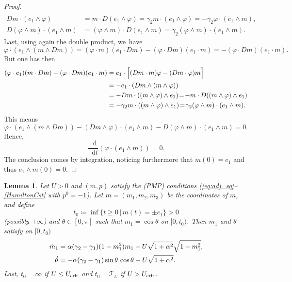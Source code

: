 \documentclass[JEP,XML,SOM,Unicode,NoEqCountersInSection,NoFloatCountersInSection,published]{cedram}
\newtheorem{lemma}[theorem]{Lemma}
\theoremstyle{definition}
\newcommand*\diff{\mathop{}\!\mathrm{d}}
\begin{document}
\begin{proof}
\begin{align*}
\\
Dm \cdot (e_1 \wedge \varphi) &= m \cdot D(e_1 \wedge \varphi) = \gamma_2 m \cdot (e_1 \wedge \varphi) = - \gamma_2 \varphi \cdot (e_1 \wedge m), \\
D (\varphi \wedge m) \cdot (e_1 \wedge m) &= (\varphi \wedge m) \cdot D (e_1 \wedge m) = \gamma_2 (\varphi \wedge m) \cdot (e_1 \wedge m).
\end{align*}
Last, using again the double product, we~have
\begin{equation*}
\varphi \cdot (e_1 \wedge (m \wedge Dm)) = (\varphi \cdot m) (e_1 \cdot Dm) - (\varphi \cdot Dm) (e_1 \cdot m) = - (\varphi \cdot Dm) (e_1 \cdot m).
\end{equation*}
But one has then
\begin{align*}
(\varphi \cdot e_1) (m \cdot Dm) - (\varphi \cdot Dm) (e_1 \cdot m) &= e_1 \cdot \Bigl[ (Dm \cdot m) \varphi - (Dm \cdot \varphi) m \Bigr] \\
& = -e_1 \cdot (Dm \wedge (m \wedge \varphi)) \\
&= -Dm \cdot ((m \wedge \varphi) \wedge e_1) \!=\! -m \cdot D ((m \wedge \varphi) \wedge e_1) \\
&= -\gamma_2 m \cdot ((m \wedge \varphi) \wedge e_1) \!=\! \gamma_2 (\varphi \wedge m) \cdot (e_1 \wedge m).
\end{align*}
This means
\begin{equation*}
\varphi \cdot (e_1 \wedge (m \wedge Dm)) - (Dm \wedge \varphi) \cdot (e_1 \wedge m) - D (\varphi \wedge m) \cdot (e_1 \wedge m) = 0.
\end{equation*}
Hence,
\begin{equation*}
\frac{\diff}{\diff t} (\varphi \cdot (e_1 \wedge m)) = 0.
\end{equation*}
The conclusion comes by integration, noticing furthermore that $m(0) = e_1$ and thus $e_1 \wedge m(0) = 0$.
\end{proof}

\begin{lemma} \label{lem:m1_theta_odes}
Let $U > 0$ and $(m, p)$ satisfy the (PMP) conditions (\eqref{eq:adj_eq}--\eqref{HamiltonCst} with $p^0 = -1$). Let $m=(m_1,m_2,m_3)$ be the coordinates of $m$, and define
\[
t_0 \coloneqq \inf \{ t \geq 0 \, | \, m (t) = \pm e_1 \} > 0
\]
(possibly $+ \infty$) and $\theta \in [0, \pi]$ such that $m_1 = \cos \theta$ on $[0, t_0)$. Then $m_1$ and $\theta$ satisfy on $[0, t_0)$
\begin{align}
\dot{m}_1 &= \alpha (\gamma_2 - \gamma_1) (1 - m_1^2) m_1 - U \sqrt{1 + \alpha^2} \sqrt{1 - m_1^2},\notag
\\
\label{eq:theta_ode}
\dot{\theta} &= - \alpha (\gamma_2 - \gamma_1) \sin{\theta} \, \cos{\theta} + U \sqrt{1 + \alpha^2}.
\end{align}
Last, $t_0 = \infty$ if $U \leq U_\textnormal{crit}$ and $t_0 = \mathcal{T}_U$ if $U > U_\textnormal{crit}$.
\end{lemma}
\end{document}
